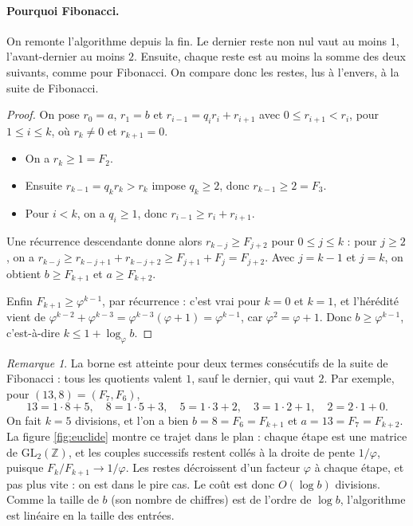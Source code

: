 \documentclass[11pt,a4paper]{article}
\theoremstyle{plain}
\theoremstyle{definition}
\theoremstyle{remark}
\newtheorem{remarque}[theoreme]{Remarque}
\newcommand{\GL}{\mathrm{GL}}
\begin{document}
\paragraph{Pourquoi Fibonacci.} On remonte l'algorithme depuis la fin. Le dernier reste non nul vaut au moins $1$, l'avant-dernier au moins $2$. Ensuite, chaque reste est au moins la somme des deux suivants, comme pour Fibonacci. On compare donc les restes, lus à l'envers, à la suite de Fibonacci.

\begin{proof}
On pose $r_0=a$, $r_1=b$ et $r_{i-1}=q_ir_i+r_{i+1}$ avec $0\leq r_{i+1}<r_i$, pour $1\leq i\leq k$, où $r_k\neq0$ et $r_{k+1}=0$.
\begin{itemize}[nosep]
\item On a $r_k\geq1=F_2$.
\item Ensuite $r_{k-1}=q_kr_k>r_k$ impose $q_k\geq2$, donc $r_{k-1}\geq2=F_3$.
\item Pour $i<k$, on a $q_i\geq1$, donc $r_{i-1}\geq r_i+r_{i+1}$.
\end{itemize}
Une récurrence descendante donne alors $r_{k-j}\geq F_{j+2}$ pour $0\leq j\leq k$ : pour $j\geq2$, on a $r_{k-j}\geq r_{k-j+1}+r_{k-j+2}\geq F_{j+1}+F_{j}=F_{j+2}$. Avec $j=k-1$ et $j=k$, on obtient $b\geq F_{k+1}$ et $a\geq F_{k+2}$.

Enfin $F_{k+1}\geq\varphi^{k-1}$, par récurrence : c'est vrai pour $k=0$ et $k=1$, et l'hérédité vient de $\varphi^{k-2}+\varphi^{k-3}=\varphi^{k-3}(\varphi+1)=\varphi^{k-1}$, car $\varphi^2=\varphi+1$. Donc $b\geq\varphi^{k-1}$, c'est-à-dire $k\leq1+\log_\varphi b$.
\end{proof}

\begin{remarque}
La borne est atteinte pour deux termes consécutifs de la suite de Fibonacci : tous les quotients valent $1$, sauf le dernier, qui vaut $2$. Par exemple, pour $(13,8)=(F_7,F_6)$,
\[
  13=1\cdot8+5,\quad 8=1\cdot5+3,\quad 5=1\cdot3+2,\quad 3=1\cdot2+1,\quad 2=2\cdot1+0 .
\]
On fait $k=5$ divisions, et l'on a bien $b=8=F_6=F_{k+1}$ et $a=13=F_7=F_{k+2}$. La figure \ref{fig:euclide} montre ce trajet dans le plan : chaque étape est une matrice de $\GL_2(\mathbb{Z})$, et les couples successifs restent collés à la droite de pente $1/\varphi$, puisque $F_{k}/F_{k+1}\to1/\varphi$. Les restes décroissent d'un facteur $\varphi$ à chaque étape, et pas plus vite : on est dans le pire cas. Le coût est donc $O(\log b)$ divisions. Comme la taille de $b$ (son nombre de chiffres) est de l'ordre de $\log b$, l'algorithme est linéaire en la taille des entrées.
\end{remarque}
\end{document}
